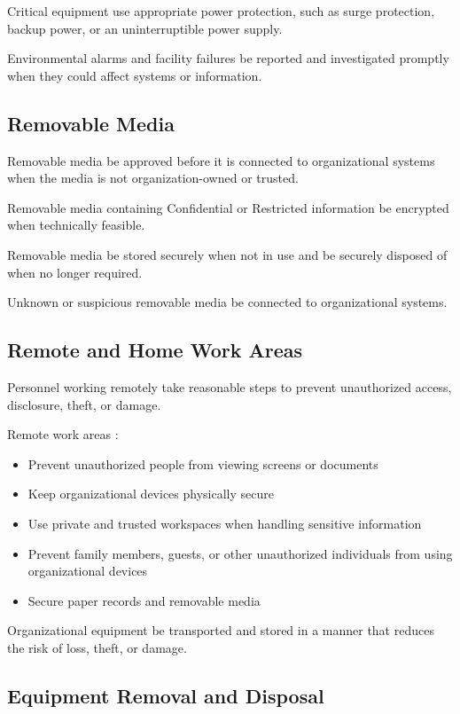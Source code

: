 Critical equipment \should{} use appropriate power protection, such as surge protection, backup power, or an uninterruptible power supply.

Environmental alarms and facility failures \must{} be reported and investigated promptly when they could affect systems or information.

\subsection{Removable Media}

Removable media \must{} be approved before it is connected to organizational systems when the media is not organization-owned or trusted.

Removable media containing Confidential or Restricted information \must{} be encrypted when technically feasible.

Removable media \must{} be stored securely when not in use and \must{} be securely disposed of when no longer required.

Unknown or suspicious removable media \mustnot{} be connected to organizational systems.

\subsection{Remote and Home Work Areas}

Personnel working remotely \must{} take reasonable steps to prevent unauthorized access, disclosure, theft, or damage.

Remote work areas \should{}:
\begin{itemize}
    \item Prevent unauthorized people from viewing screens or documents
    \item Keep organizational devices physically secure
    \item Use private and trusted workspaces when handling sensitive information
    \item Prevent family members, guests, or other unauthorized individuals from using organizational devices
    \item Secure paper records and removable media
\end{itemize}

Organizational equipment \must{} be transported and stored in a manner that reduces the risk of loss, theft, or damage.

\subsection{Equipment Removal and Disposal}

